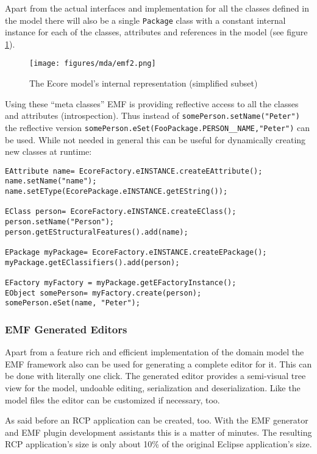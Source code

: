 Apart from the actual interfaces and implementation for all the classes defined in the model there will also be a single \verb|Package| class with a constant internal instance for each of the classes, attributes and references in the model (see figure \ref{fig:emf2}).

\begin{figure}[htp]
	\centering
	\texttt{[image: figures/mda/emf2.png]}
	\caption[Ecore metamodel]{The Ecore model's internal representation (simplified subset)}
	\label{fig:emf2}
\end{figure}

Using these ``meta classes'' EMF is providing reflective access to all the classes and attributes (introspection). Thus instead of \verb|somePerson.setName("Peter")| the reflective version \verb|somePerson.eSet(FooPackage.PERSON__NAME,"Peter")| can be used. While not needed in general this can be useful for dynamically creating new classes at runtime:

\footnotesize
\begin{verbatim}
EAttribute name= EcoreFactory.eINSTANCE.createEAttribute();
name.setName("name");
name.setEType(EcorePackage.eINSTANCE.getEString());

EClass person= EcoreFactory.eINSTANCE.createEClass();
person.setName("Person");
person.getEStructuralFeatures().add(name);

EPackage myPackage= EcoreFactory.eINSTANCE.createEPackage();
myPackage.getEClassifiers().add(person);

EFactory myFactory = myPackage.getEFactoryInstance();
EObject somePerson= myFactory.create(person);
somePerson.eSet(name, "Peter");
\end{verbatim}
\normalsize

\subsubsection*{EMF Generated Editors}

Apart from a feature rich and efficient implementation of the domain model the EMF framework also can be used for generating a complete editor for it. This can be done with literally one click. The generated editor provides a semi-visual tree view for the model, undoable editing, serialization and deserialization. Like the model files the editor can be customized if necessary, too.

As said before an RCP application can be created, too. With the EMF generator and EMF plugin development assistants this is a matter of minutes. The resulting RCP application's size is only about 10\% of the original Eclipse application's size.


